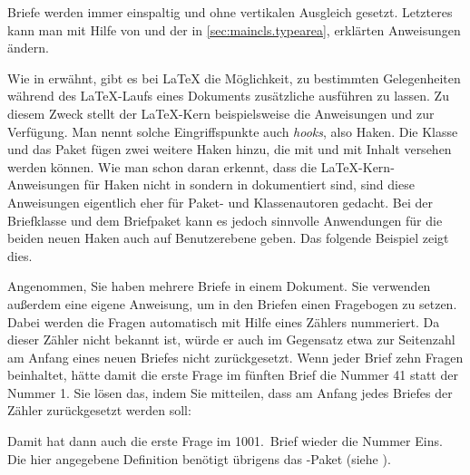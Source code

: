 Briefe werden immer
einspaltig und ohne vertikalen Ausgleich gesetzt. Letzteres kann man mit Hilfe
von  und der in
\autoref{sec:maincls.typearea}, 
erklärten Anweisungen 
ändern.%
\EndIndexGroup


\begin{Declaration}
\end{Declaration}
\iffalse%
Wie in \cite{latex:clsguide} erwähnt,
gibt es bei \LaTeX{} die Möglichkeit, zu bestimmten Gelegenheiten während des
\LaTeX-Laufs eines Dokuments zusätzliche  ausführen zu
lassen. Zu diesem Zweck stellt der \LaTeX-Kern beispielsweise die Anweisungen
 und
 zur Verfügung. Man nennt
solche Eingriffspunkte auch \emph{hooks}, also
Haken. Die Klasse  und das Paket  fügen
zwei weitere Haken hinzu, die mit  und
 mit Inhalt versehen
werden können. Wie man schon daran erkennt, dass die \LaTeX-Kern-Anweisungen
für Haken nicht in \cite{latex:usrguide} sondern in \cite{latex:clsguide}
dokumentiert sind, sind diese Anweisungen eigentlich eher für Paket- und
Klassenautoren gedacht. Bei der Briefklasse und dem Briefpaket kann es jedoch
sinnvolle Anwendungen für die beiden neuen Haken auch auf Benutzerebene
geben. Das folgende Beispiel zeigt dies.%
%
\begin{Example}
  Angenommen, Sie haben mehrere Briefe in einem Dokument. Sie verwenden
  außerdem eine eigene Anweisung, um in den Briefen einen Fragebogen
  zu setzen. Dabei werden die Fragen automatisch mit Hilfe eines
  Zählers nummeriert. Da \KOMAScript{} dieser Zähler nicht bekannt
  ist, würde er auch im Gegensatz etwa zur Seitenzahl am Anfang eines
  neuen Briefes nicht zurückgesetzt. Wenn jeder Brief zehn Fragen
  beinhaltet, hätte damit die erste Frage im fünften Brief die Nummer
  41 statt der Nummer 1. Sie lösen das, indem Sie \KOMAScript{}
  mitteilen, dass am Anfang jedes Briefes der Zähler zurückgesetzt
  werden soll:
\begin{lstcode}
  \newcommand{\Frage}[1]{%
    \par
    \refstepcounter{Frage}%
    \noindent
    \begin{tabularx}{\textwidth}{l@{}X}
      \theFrage:~ & #1\\
    \end{tabularx}%
  }%
  \AtBeginLetter{\setcounter{Frage}{0}}
\end{lstcode}
  Damit hat dann auch die erste Frage im 1001.~Brief wieder die Nummer
  Eins. Die hier angegebene Definition benötigt übrigens das
  -Paket (siehe
  \cite{package:tabularx}).
\end{Example}
